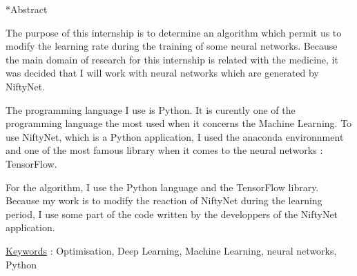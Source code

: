 \documentclass{book}
\newcommand{\p}{\vspace{0.2cm}}
\begin{document}
	\begin{section}*{Abstract}

		The purpose of this internship is to determine an algorithm which permit us to modify the learning rate during the training of some neural networks. Because the main domain of research for this internship is related with the medicine, it was decided that I will work with neural networks which are generated by NiftyNet.\p

		The programming language I use is Python. It is curently one of the programming language the most used when it concerns the Machine Learning. To use NiftyNet, which is a Python application, I used the anaconda environnment and one of the most famous library when it comes to the neural networks : TensorFlow.

		For the algorithm, I use the Python language and the TensorFlow library. Because my work is to modify the reaction of NiftyNet during the learning period, I use some part of the code written by the developpers of the NiftyNet application.\p

		\ul{Keywords} : Optimisation, Deep Learning, Machine Learning, neural networks, Python

	\end{section}
	\setcounter{tocdepth}{3}
	\renewcommand{\contentsname}{Table des matières}
	\tableofcontents

	\clearpage

	\begingroup
	\let\clearpage\relax
	\listoftables
	\listoffigures
	\endgroup

	\clearpage
\end{document}
